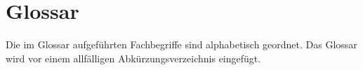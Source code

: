 \part{Glossar}
Die im Glossar aufgeführten Fachbegriffe sind alphabetisch geordnet. Das Glossar wird vor einem allfälligen Abkürzungsverzeichnis eingefügt.